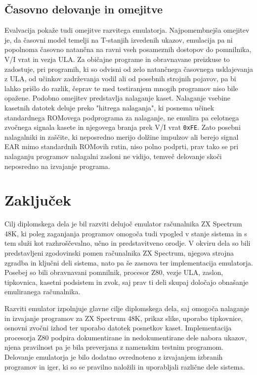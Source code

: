 \documentclass[a4paper, 12pt, openright]{book}
\begin{document}
    \section{Časovno delovanje in omejitve}

    Evalvacija pokaže tudi omejitve razvitega emulatorja. Najpomembnejša omejitev
    je, da časovni model temelji na T-stanjih izvedenih ukazov, emulacija pa ni popolnoma
    časovno natančna na ravni vseh posameznih dostopov do pomnilnika, V/I vrat
    in vezja ULA. Za običajne programe in obravnavane preizkuse to zadostuje,
    pri programih, ki so odvisni od zelo natančnega časovnega usklajevanja z ULA,
    od učinkov zadrževanja vodil ali od posebnih strojnih pojavov, pa bi lahko prišlo
    do razlik, čeprav te med testiranjem mnogih programov niso bile opažene. Podobno
    omejitev predstavlja nalaganje kaset. Nalaganje vsebine kasetnih datotek
    deluje preko "hitrega nalaganja", ki posnema učinek standardnega ROMovega podprograma
    za nalaganje, ne emulira pa celotnega zvočnega signala kasete in njegovega
    branja prek V/I vrat \texttt{0xFE}. Zato posebni nalagalniki in zaščite, ki neposredno
    merijo dolžine impulzov ali berejo signal EAR mimo standardnih ROMovih rutin,
    niso polno podprti, prav tako se pri nalaganju programov nalagalni zasloni ne
    vidijo, temveč delovanje skoči neposredno na izvajanje programa.

    \chapter{Zaključek}

    Cilj diplomskega dela je bil razviti delujoč emulator računalnika ZX
    Spectrum 48K, ki poleg zaganjanja programov omogoča tudi vpogled v stanje sistema
    in s tem služi kot razhroščevalno, učno in predstavitveno orodje. V okviru dela
    so bili predstavljeni zgodovinski pomen računalnika ZX Spectrum, njegova
    strojna zgradba in ključni deli sistema, nato pa še zasnova ter implementacija
    emulatorja. Posebej so bili obravnavani pomnilnik, procesor Z80, vezje ULA, zaslon,
    tipkovnica, kasetni podsistem in zvok, saj prav ti deli skupaj določajo
    obnašanje emuliranega računalnika.

    Razviti emulator izpolnjuje glavne cilje diplomskega dela, saj omogoča nalaganje
    in izvajanje programov za ZX Spectrum 48K, prikaz slike, uporabo tipkovnice,
    osnovni zvočni izhod ter uporabo datotek posnetkov kaset. Implementacija procesorja
    Z80 podpira dokumentirane in nedokumentirane dele nabora ukazov, njena
    pravilnost pa je bila preverjana z namenskim testnim programom. Delovanje emulatorja
    je bilo dodatno ovrednoteno z izvajanjem izbranih programov in iger, ki so
    se pravilno naložili in uporabljali različne dele sistema.
\end{document}
